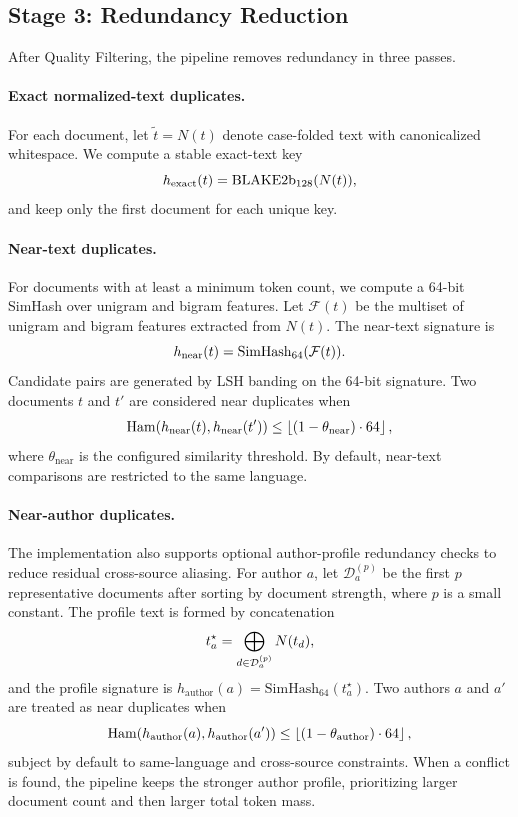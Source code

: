 \documentclass{article}
\begin{document}
\subsection{Stage 3: Redundancy Reduction}
\label{subsec:construct-dedup}
{\color{red}After Quality Filtering, the pipeline removes redundancy in three passes.}

\paragraph{Exact normalized-text duplicates.}
{\color{red}For each document, let $\widetilde{t}=N(t)$ denote case-folded text with canonicalized whitespace. We compute a stable exact-text key}
\[
{\color{red}
h_{\text{exact}}(t)=\mathrm{BLAKE2b}_{128}(N(t)),
}
\]
{\color{red}and keep only the first document for each unique key.}

\paragraph{Near-text duplicates.}
{\color{red}For documents with at least a minimum token count, we compute a 64-bit SimHash over unigram and bigram features. Let $\mathcal{F}(t)$ be the multiset of unigram and bigram features extracted from $N(t)$. The near-text signature is}
\[
{\color{red}
h_{\text{near}}(t)=\mathrm{SimHash}_{64}(\mathcal{F}(t)).
}
\]
{\color{red}Candidate pairs are generated by LSH banding on the 64-bit signature. Two documents $t$ and $t'$ are considered near duplicates when}
\[
{\color{red}
\mathrm{Ham}\!\left(h_{\text{near}}(t),h_{\text{near}}(t')\right)\le
\left\lfloor (1-\theta_{\text{near}})\cdot 64 \right\rfloor,
}
\]
{\color{red}where $\theta_{\text{near}}$ is the configured similarity threshold. By default, near-text comparisons are restricted to the same language.}

\paragraph{Near-author duplicates.}
{\color{red}The implementation also supports optional author-profile redundancy checks to reduce residual cross-source aliasing. For author $a$, let $\mathcal{D}_a^{(p)}$ be the first $p$ representative documents after sorting by document strength, where $p$ is a small constant. The profile text is formed by concatenation}
\[
{\color{red}
t_a^{\star}=\bigoplus_{d\in \mathcal{D}_a^{(p)}} N(t_d),
}
\]
{\color{red}and the profile signature is $h_{\text{author}}(a)=\mathrm{SimHash}_{64}(t_a^{\star})$. Two authors $a$ and $a'$ are treated as near duplicates when}
\[
{\color{red}
\mathrm{Ham}\!\left(h_{\text{author}}(a),h_{\text{author}}(a')\right)\le
\left\lfloor (1-\theta_{\text{author}})\cdot 64 \right\rfloor,
}
\]
{\color{red}subject by default to same-language and cross-source constraints. When a conflict is found, the pipeline keeps the stronger author profile, prioritizing larger document count and then larger total token mass.}
\end{document}
